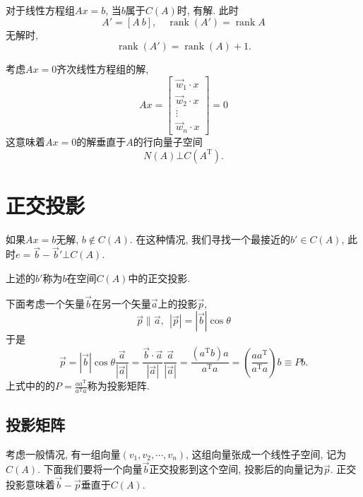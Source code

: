 对于线性方程组$Ax=b$, 当$b$属于$C(A)$时, 有解. 此时
\begin{equation}
  A'= [A\  b], \quad \operatorname{rank}(A')=\operatorname{rank}A
\end{equation}
无解时, 
\begin{equation}
  \operatorname{rank}(A')=\operatorname{rank}(A)+1.
\end{equation}

考虑$Ax=0$齐次线性方程组的解, 
\begin{equation}
  Ax = \begin{bmatrix} 
  \vec{w}_1\cdot x \\ 
  \vec{w}_2\cdot x \\ 
  \vdots \\ 
  \vec{w}_n\cdot x 
  \end{bmatrix}=0
\end{equation}
这意味着$Ax=0$的解垂直于$A$的行向量子空间
\begin{equation}
  N(A)\bot C(A^{\mathrm{T}}).
\end{equation}

\section{正交投影}

如果$Ax=b$无解, $b \notin C(A)$. 在这种情况, 我们寻找一个最接近的$b' \in C(A)$, 此时$e=\vec{b}-\vec{b}' \bot C(A)$.
\begin{definition}
    上述的$b'$称为$b$在空间$C(A)$中的正交投影.
\end{definition}

\begin{example}
    下面考虑一个矢量$\vec{b}$在另一个矢量$\vec{a}$上的投影$\vec{p}$,
    \begin{equation}
      \vec{p} \parallel \vec{a} ,\ \  |\vec{p}| = |\vec{b}| \cos \theta
    \end{equation}
    于是
    \begin{equation}
      \vec{p} = |\vec{b}|\cos\theta \frac{\vec{a}}{|\vec{a}|} =\frac{\vec{b}\cdot \vec{a}}{|\vec{a}|} \frac{\vec{a}}{|\vec{a}|}= \frac{\left( a^{\mathrm{T}}b \right) a}{a^{\mathrm{T}}a} = \left( \frac{a a^{\mathrm{T}}}{a^{\mathrm{T}} a} \right) b \equiv  P b.
    \end{equation}
    上式中的的$\displaystyle P= \frac{a a^{\mathrm{T}}}{a^{\mathrm{T}} a}$称为投影矩阵.
\end{example}

\subsection{投影矩阵}
考虑一般情况, 有一组向量$(v_1,v_2,\cdots,v_n)$, 这组向量张成一个线性子空间, 记为$C(A)$. 
下面我们要将一个向量$\vec{b}$正交投影到这个空间, 投影后的向量记为$\vec{p}$. 正交投影意味着$\vec{b}-\vec{p}$垂直于$C(A)$.

